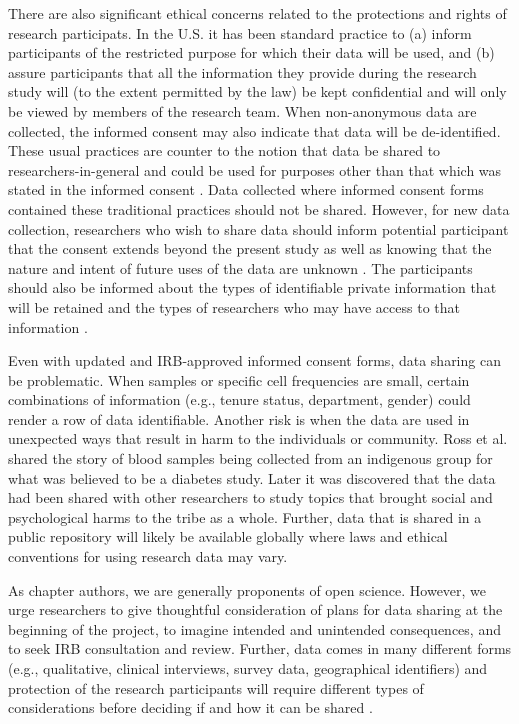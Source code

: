 \documentclass[
  11pt,
]{book}
\begin{document}
There are also significant ethical concerns related to the protections and rights of research participats. In the U.S. it has been standard practice to (a) inform participants of the restricted purpose for which their data will be used, and (b) assure participants that all the information they provide during the research study will (to the extent permitted by the law) be kept confidential and will only be viewed by members of the research team. When non-anonymous data are collected, the informed consent may also indicate that data will be de-identified. These usual practices are counter to the notion that data be shared to researchers-in-general and could be used for purposes other than that which was stated in the informed consent \citep{ross_ethical_2018}. Data collected where informed consent forms contained these traditional practices should not be shared. However, for new data collection, researchers who wish to share data should inform potential participant that the consent extends beyond the present study as well as knowing that the nature and intent of future uses of the data are unknown \citep{ross_ethical_2018}. The participants should also be informed about the types of identifiable private information that will be retained and the types of researchers who may have access to that information \citep{alter_responsible_2018}.

Even with updated and IRB-approved informed consent forms, data sharing can be problematic. When samples or specific cell frequencies are small, certain combinations of information (e.g., tenure status, department, gender) could render a row of data identifiable. Another risk is when the data are used in unexpected ways that result in harm to the individuals or community. Ross et al. \citeyearpar{ross_ethical_2018} shared the story of blood samples being collected from an indigenous group for what was believed to be a diabetes study. Later it was discovered that the data had been shared with other researchers to study topics that brought social and psychological harms to the tribe as a whole. Further, data that is shared in a public repository will likely be available globally where laws and ethical conventions for using research data may vary.

As chapter authors, we are generally proponents of open science. However, we urge researchers to give thoughtful consideration of plans for data sharing at the beginning of the project, to imagine intended and unintended consequences, and to seek IRB consultation and review. Further, data comes in many different forms (e.g., qualitative, clinical interviews, survey data, geographical identifiers) and protection of the research participants will require different types of considerations before deciding if and how it can be shared \citep{ross_ethical_2018}.
\end{document}
